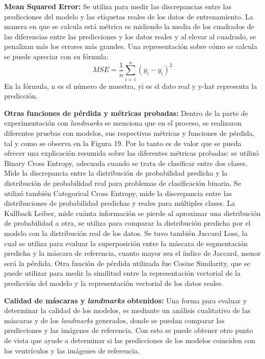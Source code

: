 \documentclass[runningheads]{llncs}
\begin{document}
\textbf{Mean Squared Error:} Se utiliza para medir las discrepancias entre las predicciones del modelo y las etiquetas reales de los datos de entrenamiento. La manera en que se calcula está métrica es midiendo la media de los cuadrados de las diferencias entre las predicciones y los datos reales y al elevar al cuadrado, se penalizan más los errores más grandes. Una representación sobre cómo se calcula se puede apreciar con su fórmula: \begin{equation}
MSE = \frac{1}{n} \sum_{i=1}^{n} (y_i - \hat{y}_i)^2 
\end{equation}
En la fórmula, n es el número de muestra, yi es el dato real y y-hat representa la predicción. \citep{gupta2023mse}

\textbf{Otras funciones de pérdida y métricas probadas:} Dentro de la parte de experimentación con \textit{landmarks} se menciona que en el proceso, se realizaron diferentes pruebas con modelos, sus respectivas métricas y funciones de pérdida, tal y como se observa en la Figura 19. Por lo tanto es de valor que se pueda ofrecer una explicación resumida sobre las diferentes métricas probadas: 
se utilizó Binary Cross Entropy, adecuada cuando se trata de clasificar entre dos clases. Mide la discrepancia entre la distribución de probabilidad predicha y la distribución de probabilidad real para problemas de clasificación binaria. Se utilizó también Categorical Cross Entropy, mide la discrepancia entre las distribuciones de probabilidad predichas y reales para múltiples clases. La Kullback Leiber, mide cuánta información se pierde al aproximar una distribución de probabilidad a otra, se utiliza para comparar la distribución predicha por el modelo con la distribución real de los datos. Se tuvo también Jaccard Loss, la cual se utiliza para evaluar la superposición entre la máscara de segmentación predicha y la máscara de referencia, cuanto mayor sea el índice de Jaccard, menor será la pérdida. Otra función de pérdida utilizada fue Cosine Similarity, que se puede utilizar para medir la similitud entre la representación vectorial de la predicción del modelo y la representación vectorial de los datos reales. \citep{pandit2023lossfunctions} 

\textbf{Calidad de máscaras y \textit{landmarks} obtenidos:} Una forma para evaluar y determinar la calidad de los modelos, es mediante un análisis cualitativo de las máscaras y de los \textit{landmarks} generados, donde se puedan comparar las predicciones y las imágenes de referencia. Con esto se puede obtener otro punto de vista que ayude a determinar si las predicciones de los modelos coinciden con los ventrículos y las imágenes de referencia.
\end{document}
